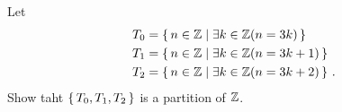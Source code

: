 \guard



\begin{exercise}
\label{exercise:paritionOfIntegers}
  Let
  \begin{align*}
    T_0 &= \left\{\,n\in\mathbb{Z} \mid \exists k\in\mathbb{Z}(n=3k)\,\right\} \\
    T_1 &= \left\{\,n\in\mathbb{Z} \mid \exists k\in\mathbb{Z}(n=3k+1)\,\right\} \\
    T_2 &= \left\{\,n\in\mathbb{Z} \mid \exists k\in\mathbb{Z}(n=3k+2)\,\right\} \,.
  \end{align*}
  Show taht $\left\{\, T_0, T_1, T_2\,\right\}$ is a partition of $\mathbb{Z}$.
\end{exercise}
